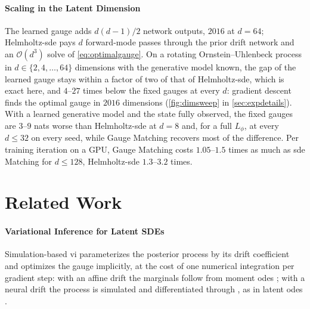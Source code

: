 \documentclass{article} %
\begin{document}
\paragraph{Scaling in the Latent Dimension}
\label{sec:exp:dimsweep}
The learned gauge adds $d(d-1)/2$ network outputs, $2016$ at $d = 64$; Helmholtz-\gls{sde} pays $d$ forward-mode passes through the prior drift network and an $\mathcal{O}(d^3)$ solve of \cref{eq:optimalgauge}. On a rotating Ornstein--Uhlenbeck process in $d \in \{2, 4, \ldots, 64\}$ dimensions with the generative model known, the gap of the learned gauge stays within a factor of two of that of Helmholtz-\gls{sde}, which is exact here, and $4$--$27$ times below the fixed gauges at every $d$: gradient descent finds the optimal gauge in $2016$ dimensions (\cref{fig:dimsweep} in \cref{sec:expdetails}). With a learned generative model and the state fully observed, the fixed gauges are $3$--$9$ nats worse than Helmholtz-\gls{sde} at $d = 8$ and, for a full $L_\phi$, at every $d \le 32$ on every seed, while Gauge Matching recovers most of the difference. Per training iteration on a GPU, Gauge Matching costs $1.05$--$1.5$ times as much as \gls{sde} Matching for $d \le 128$, Helmholtz-\gls{sde} $1.3$--$3.2$ times.
\section{Related Work}
\label{sec:relatedwork}

\paragraph{Variational Inference for Latent SDEs}
Simulation-based \gls{vi} parameterizes the posterior process by its drift coefficient and optimizes the gauge implicitly, at the cost of one numerical integration per gradient step: with an affine drift the marginals follow from moment \glspl{ode} \citep{archambeau2007gaussian,archambeau2007variational,duncker2019learning,wildner2021moment,kohs2021variational,verma2024variational,hu2025sing,park2025amortized}; with a neural drift the process is simulated and differentiated through \citep{movellan2002monte,ryder2018black,tzen2019neural,hodgkinson2020stochastic,li2020scalable,kidger2021efficient}, as in latent \glspl{ode} \citep{chen2018neural,rubanova2019latent}.
\end{document}
